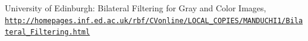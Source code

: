 \documentclass[journal]{IEEEtran}
\begin{document}

%
%
%
\begin{thebibliography}{1}
University of Edinburgh: Bilateral Filtering for Gray and Color Images,
\\\texttt{\url{http://homepages.inf.ed.ac.uk/rbf/CVonline/LOCAL_COPIES/MANDUCHI1/Bilateral_Filtering.html}}

\end{thebibliography}

% 

\end{document}
